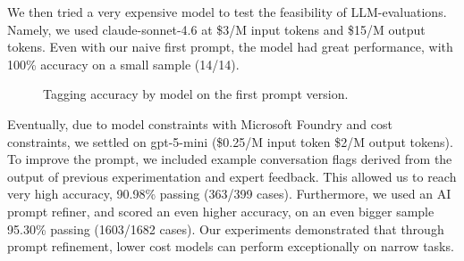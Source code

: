 \documentclass[12pt]{article}
\begin{document}
    We then tried a very expensive model to test the feasibility of LLM-evaluations.
    Namely, we used claude-sonnet-4.6 at \$3/M input tokens and \$15/M output tokens.
    Even with our naive first prompt, the model had great performance, with 100\% accuracy on a small sample (14/14).

    \begin{figure}[H]
        \centering
        \caption{Tagging accuracy by model on the first prompt version.}
        \label{fig:model-accuracy}
    \end{figure}

    Eventually, due to model constraints with Microsoft Foundry and cost constraints, we settled on gpt-5-mini (\$0.25/M input token \$2/M output tokens).
    To improve the prompt, we included example conversation flags derived from the output of previous experimentation and expert feedback. This allowed us to reach very high accuracy, 90.98\% passing (363/399 cases).
    Furthermore, we used an AI prompt refiner, and scored an even higher accuracy, on an even bigger sample 95.30\% passing (1603/1682 cases).
    Our experiments demonstrated that through prompt refinement, lower cost models can perform exceptionally on narrow tasks.
\end{document}
